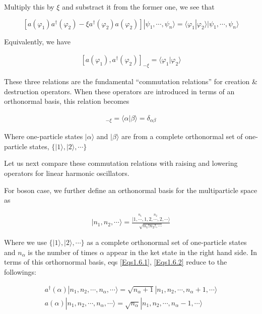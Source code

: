 Multiply this by $\xi$ and substract it from the former one, we see that

\[[a(\varphi_1)a^\dagger(\varphi_2) - \xi a^\dagger(\varphi_2)a(\varphi_2)]|\psi_1,\cdots,\psi_n\rangle = \langle \varphi_1|\varphi_2\rangle |\psi_1,\cdots,\psi_n\rangle \]

Equivalently, we have

\begin{align}\label{eqs1.6.5}
[a(\varphi_1),a^\dagger(\varphi_2)] _{-\xi} = \langle\varphi_1|\varphi_2\rangle
\end{align}

These three relations are the fundamental ``commutation relations'' for creation \& destruction operators. When these operators are introduced in terms of an orthonormal basis, this relation becomes

\begin{align}
[a(\alpha),a^\dagger(\beta)]_{-\xi} = \langle\alpha|\beta\rangle = \delta_{\alpha\beta}
\end{align}

Where one-particle states $|\alpha\rangle$ and $|\beta\rangle$ are from a complete orthonormal set of one-particle states, $\{|1\rangle,|2\rangle,\cdots\}$

Let us next compare these commutation relations with raising and lowering operators for linear harmonic oscillators. 

For boson case, we further define an orthonormal basis for the multiparticle space as 

\begin{align}|n_1,n_2,\cdots\rangle = \frac{|\overset{n_1}{1,\cdots,1},\overset{n_2}{2,\cdots,2},\cdots\rangle}{\sqrt{n_1! n_2!,\cdots}} \end{align}

Where we use $\{|1\rangle,|2\rangle,\cdots\}$ as a complete orthonormal set of one-particle states and $n_{\alpha}$ is the number of times $\alpha$ appear in the ket state in the right hand side. In terms of this orthornormal basis, eqs \eqref{Eqs1.6.1}, \eqref{Eqs1.6.2} reduce to the followings:

\begin{align}
a^\dagger(\alpha)|n_1,n_2,\cdots,n_{\alpha},\cdots\rangle = \sqrt{n_\alpha+1}|n_1,n_2,\cdots,n_{\alpha}+1,\cdots\rangle\\
a(\alpha)|n_1,n_2,\cdots,n_{\alpha},\cdots\rangle = \sqrt{n_\alpha}|n_1,n_2,\cdots,n_{\alpha}-1,\cdots\rangle
\end{align}

